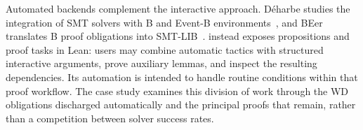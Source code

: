 Automated backends complement the interactive approach. D\'eharbe studies
the integration of SMT solvers with B and Event-B environments~\cite{DeharbeBSMT},
and BEer translates B proof obligations into SMT-LIB~\cite{beer}.
\barrel instead exposes propositions and proof tasks in Lean: users may
combine automatic tactics with structured interactive arguments, prove
auxiliary lemmas, and inspect the resulting dependencies. Its automation
is intended to handle routine conditions within that proof workflow.
The case study examines this division of work through the
WD obligations discharged automatically and the principal proofs that
remain, rather than a competition between solver success rates.
